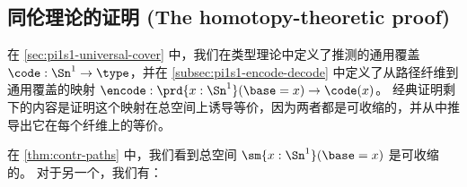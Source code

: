 %

\subsection{同伦理论的证明 (The homotopy-theoretic proof)}
\label{subsec:pi1s1-homotopy-theory}

在 \cref{sec:pi1s1-universal-cover} 中，我们在类型理论中定义了推测的通用覆盖 $\code:\Sn^1\to\type$，并在 \cref{subsec:pi1s1-encode-decode} 中定义了从路径纤维到通用覆盖的映射 $\encode : \prd{x:\Sn^1} (\base=x) \to \code(x)$。
经典证明剩下的内容是证明这个映射在总空间上诱导等价，因为两者都是可收缩的，并从中推导出它在每个纤维上的等价。

%
在 \cref{thm:contr-paths} 中，我们看到总空间 $\sm{x:\Sn^1} (\base=x)$ 是可收缩的。
对于另一个，我们有：

